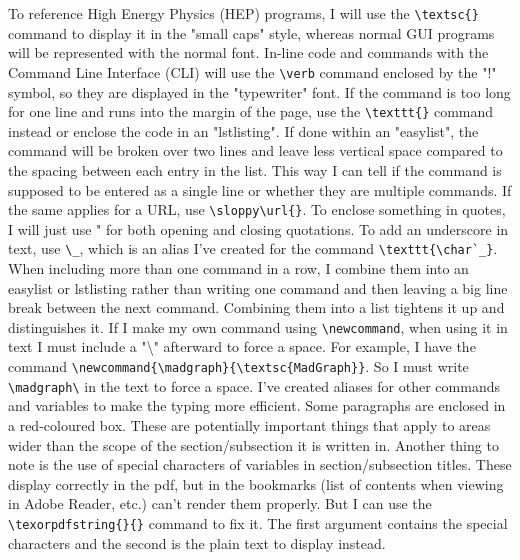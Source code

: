 To reference High Energy Physics (HEP) programs, I will use the \verb!\textsc{}! command to display it in the "small caps" style, whereas normal GUI programs will be represented with the normal font. In-line code and commands with the Command Line Interface (CLI) will use the \verb!\verb! command enclosed by the "!" symbol, so they are displayed in the "typewriter" font. If the command is too long for one line and runs into the margin of the page, use the \verb!\texttt{}! command instead or enclose the code in an "lstlisting". If done within an "easylist", the command will be broken over two lines and leave less vertical space compared to the spacing between each entry in the list. This way I can tell if the command is supposed to be entered as a single line or whether they are multiple commands. If the same applies for a URL, use \verb!\sloppy\url{}!. To enclose something in quotes, I will just use " for both opening and closing quotations. To add an underscore in text, use \verb!\_!, which is an alias I've created for the command \verb!\texttt{\char`_}!. When including more than one command in a row, I combine them into an easylist or lstlisting rather than writing one command and then leaving a big line break between the next command. Combining them into a list tightens it up and distinguishes it. If I make my own command using \verb!\newcommand!, when using it in text I must include a "\textbackslash" afterward to force a space. For example, I have the command \verb!\newcommand{\madgraph}{\textsc{MadGraph}}!. So I must write \verb!\madgraph\! in the text to force a space. I've created aliases for other commands and variables to make the typing more efficient. Some paragraphs are enclosed in a red-coloured box. These are potentially important things that apply to areas wider than the scope of the section/subsection it is written in. Another thing to note is the use of special characters of variables in section/subsection titles. These display correctly in the pdf, but in the bookmarks (list of contents when viewing in Adobe Reader, etc.) can't render them properly. But I can use the \verb!\texorpdfstring{}{}! command to fix it. The first argument contains the special characters and the second is the plain text to display instead.

